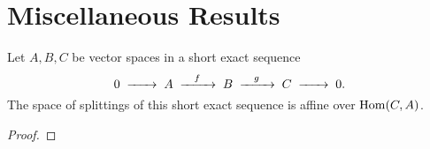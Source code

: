 \chapter{Miscellaneous Results}

\begin{proposition}\label{prop:splittings_affine}
  Let $A, B, C$ be vector spaces in a short exact sequence 
  \[
    0 \lkxto A \lkxto[f] B \lkxto[g] C\lkxto 0.
  \]
  The space of splittings of this short exact sequence is affine over $\operatorname{Hom}(C, A)$.
\end{proposition}
\begin{proof}
\end{proof}

